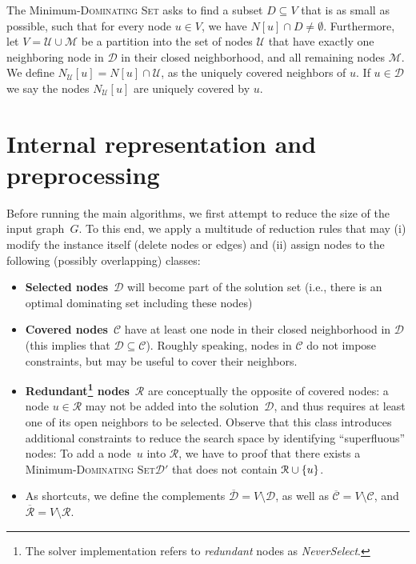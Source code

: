 \documentclass[a4paper, USenglish, cleveref, autoref, thm-restate, noalgorithm2e]{socg-lipics-v2021}
\newcommand{\set}[1]{\ensuremath\left\{#1\right\}}
\newcommand{\Dom}{\textsc{Dominating Set}\xspace}
\newcommand{\ie}{i.e.,\xspace}
\newcommand{\domset}{\ensuremath{\mathcal D}\xspace}
\newcommand{\cov}{\ensuremath{\mathcal C}\xspace}
\newcommand{\red}{\ensuremath{\mathcal R}\xspace}
\newcommand{\uniquelycovered}{\ensuremath{\mathcal U}\xspace}
\newcommand{\multicovered}{\ensuremath{\mathcal M}\xspace}
\newcommand{\cdomset}{\ensuremath{\overline{\mathcal D}}\xspace}
\newcommand{\ccov}{\ensuremath{\overline{\mathcal C}}\xspace}
\newcommand{\cred}{\ensuremath{\overline{\mathcal R}}\xspace}
\begin{document}
The Minimum-\Dom asks to find a subset $D \subseteq V$ that is as small as possible, such that for every node $u \in V$, we have $N[u] \cap D \neq \emptyset$.
Furthermore, let $V=\uniquelycovered\cup\multicovered$ be a partition into the set of nodes $\uniquelycovered$ that have exactly one neighboring node in $\domset$ in their closed neighborhood, and all remaining nodes $\multicovered$.
We define $N_{\uniquelycovered}[u] = N[u]\cap \uniquelycovered$, as the uniquely covered neighbors of $u$.
If $u\in \domset$ we say the nodes $N_{\uniquelycovered}[u]$ are uniquely covered by $u$.



\section{Internal representation and preprocessing}\label{sec:preprocessing}
Before running the main algorithms, we first attempt to reduce the size of the input graph~$G$.
To this end, we apply a multitude of reduction rules that may
(i) modify the instance itself (delete nodes or edges) and
(ii) assign nodes to the following (possibly overlapping) classes:
\begin{itemize}
    \item \textbf{Selected nodes}~\domset will become part of the solution set (\ie there is an optimal dominating set including these nodes)
    \item \textbf{Covered nodes}~\cov have at least one node in their closed neighborhood in \domset (this implies that $\domset \subseteq \cov$).
          Roughly speaking, nodes in \cov do not impose constraints, but may be useful to cover their neighbors.
    \item \textbf{Redundant\footnote{The solver implementation refers to \emph{redundant} nodes as \emph{NeverSelect}.} nodes}~\red are conceptually the opposite of covered nodes:
          a node $u \in \red$ may not be added into the solution~\domset, and thus requires at least one of its open neighbors to be selected.
          Observe that this class introduces additional constraints to reduce the search space by identifying ``superfluous'' nodes:
          To add a node~$u$ into \red, we have to proof that there exists a Minimum-\Dom $\domset'$ that does not contain $\red \cup \set{u}$.

    \item As shortcuts, we define the complements $\cdomset = V \setminus \domset$, as well as $\ccov = V \setminus \cov$, and $\cred = V \setminus \red$.
\end{itemize}
\end{document}
